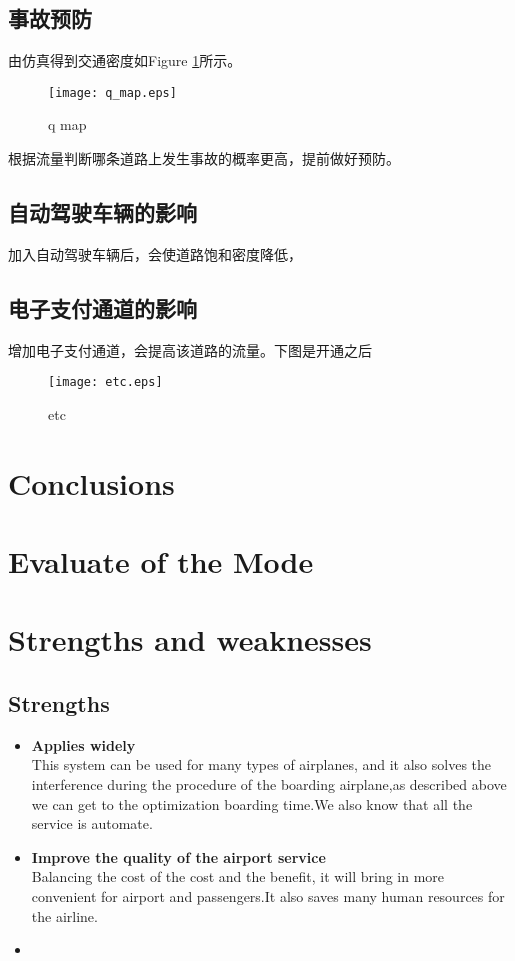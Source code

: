 \documentclass{mcmthesis}
\begin{document}
\subsection{事故预防}
由仿真得到交通密度如Figure \ref{fig:q_map}所示。
\begin{figure}[!htbp]
	\small
	\centering
	\texttt{[image: q\_map.eps]}
	\caption{q map} 
	\label{fig:q_map}
\end{figure}
根据流量判断哪条道路上发生事故的概率更高，提前做好预防。

\subsection{自动驾驶车辆的影响}
加入自动驾驶车辆后，会使道路饱和密度降低，

\subsection{电子支付通道的影响}
增加电子支付通道，会提高该道路的流量。下图是开通之后
\begin{figure}[!htbp]
	\small
	\centering
	\texttt{[image: etc.eps]}
	\caption{etc} 
	\label{fig:etc}
\end{figure}
\section{Conclusions}
\lipsum[6]

\section{Evaluate of the Mode}

\section{Strengths and weaknesses}
\lipsum[12]

\subsection{Strengths}
\begin{itemize}
\item \textbf{Applies widely}\\
This  system can be used for many types of airplanes, and it also
solves the interference during  the procedure of the boarding
airplane,as described above we can get to the  optimization
boarding time.We also know that all the service is automate.
\item \textbf{Improve the quality of the airport service}\\
Balancing the cost of the cost and the benefit, it will bring in
more convenient  for airport and passengers.It also saves many
human resources for the airline. \item \textbf{}
\end{itemize}
\end{document}
